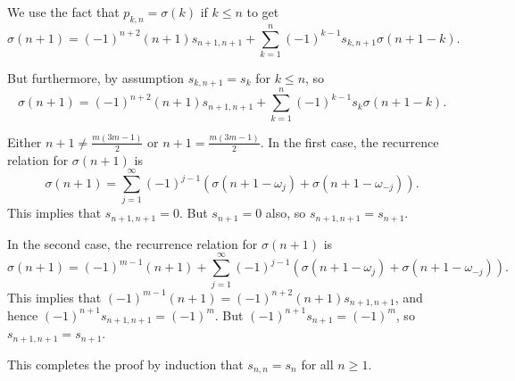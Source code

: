 \documentclass{article}
\theoremstyle{definition}
\begin{document}
We use the fact that $p_{k,n}=\sigma(k)$ if $k \leq n$ to get
\[
\sigma(n+1)=
(-1)^{n+2}(n+1)s_{n+1,n+1}
+\sum_{k=1}^n (-1)^{k-1} s_{k,n+1}\sigma(n+1-k).
\]

But furthermore, by assumption $s_{k,n+1}=s_k$ for $k \leq n$, so
\[
\sigma(n+1)=(-1)^{n+2}(n+1)s_{n+1,n+1}
+\sum_{k=1}^n (-1)^{k-1} s_k\sigma(n+1-k).
\]

Either $n+1 \neq \frac{m(3m-1)}{2}$ or $n+1=\frac{m(3m-1)}{2}$.
In the first case, the recurrence relation for $\sigma(n+1)$ is
\[
\sigma(n+1)=\sum_{j=1}^\infty (-1)^{j-1}(\sigma(n+1-\omega_j)
+\sigma(n+1-\omega_{-j})).
\]
This implies that $s_{n+1,n+1}=0$. But $s_{n+1}=0$ also, so $s_{n+1,n+1}=s_{n+1}$.

In the second case, the recurrence relation for $\sigma(n+1)$ is
\[
\sigma(n+1)=(-1)^{m-1}(n+1)
+\sum_{j=1}^\infty (-1)^{j-1}(\sigma(n+1-\omega_j)+\sigma(n+1-\omega_{-j})).
\]
This implies that $(-1)^{m-1}(n+1)=(-1)^{n+2}(n+1)s_{n+1,n+1}$, and hence
$(-1)^{n+1}s_{n+1,n+1}=(-1)^m$. But $(-1)^{n+1}s_{n+1}=(-1)^m$, so
$s_{n+1,n+1}=s_{n+1}$.

This completes the proof by induction that $s_{n,n}=s_n$ for all $n \geq 1$.




\end{document}
